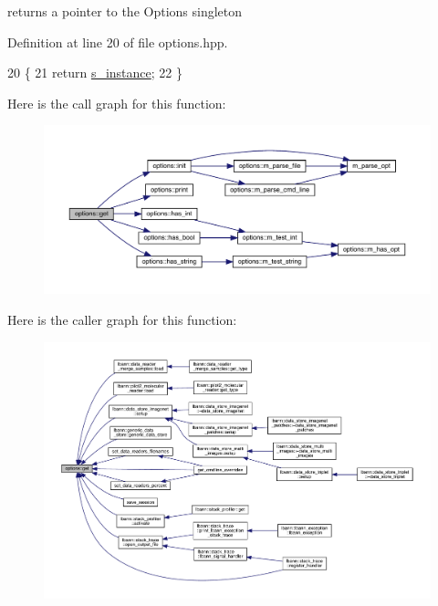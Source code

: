 returns a pointer to the Options singleton 



Definition at line 20 of file options.\+hpp.


\begin{DoxyCode}
20                          \{
21     \textcolor{keywordflow}{return} \hyperlink{classoptions_ab10ed8295e9333b025619195d156a9ed}{s\_instance};
22   \}
\end{DoxyCode}
Here is the call graph for this function\+:\nopagebreak
\begin{figure}[H]
\begin{center}
\leavevmode
\includegraphics[width=350pt]{classoptions_a9ecfe9c365269df68a41b961c31ae3f5_cgraph}
\end{center}
\end{figure}
Here is the caller graph for this function\+:\nopagebreak
\begin{figure}[H]
\begin{center}
\leavevmode
\includegraphics[width=350pt]{classoptions_a9ecfe9c365269df68a41b961c31ae3f5_icgraph}
\end{center}
\end{figure}
\mbox{\label{classoptions_a99aa190102de33e2aed39723929f9fad}} 
